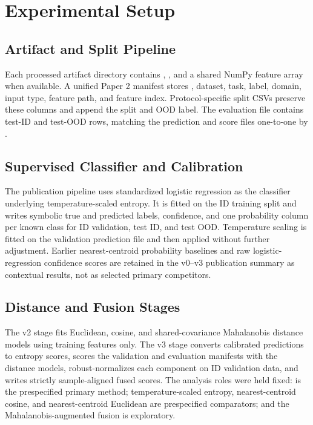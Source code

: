 \section{Experimental Setup}
\label{sec:experimental-setup}

\subsection{Artifact and Split Pipeline}

Each processed artifact directory contains , , and a shared NumPy feature array when available. A unified Paper 2 manifest stores , dataset, task, label, domain, input type, feature path, and feature index. Protocol-specific split CSVs preserve these columns and append the split and OOD label. The evaluation file contains test-ID and test-OOD rows, matching the prediction and score files one-to-one by .

\subsection{Supervised Classifier and Calibration}

The publication pipeline uses standardized logistic regression as the classifier underlying temperature-scaled entropy. It is fitted on the ID training split and writes symbolic true and predicted labels, confidence, and one probability column per known class for ID validation, test ID, and test OOD. Temperature scaling is fitted on the validation prediction file and then applied without further adjustment. Earlier nearest-centroid probability baselines and raw logistic-regression confidence scores are retained in the v0--v3 publication summary as contextual results, not as selected primary competitors.

\subsection{Distance and Fusion Stages}

The v2 stage fits Euclidean, cosine, and shared-covariance Mahalanobis distance models using training features only. The v3 stage converts calibrated predictions to entropy scores, scores the validation and evaluation manifests with the distance models, robust-normalizes each component on ID validation data, and writes strictly sample-aligned fused scores. The analysis roles were held fixed: \primarymethod{} is the prespecified primary method; temperature-scaled entropy, nearest-centroid cosine, and nearest-centroid Euclidean are prespecified comparators; and the Mahalanobis-augmented fusion is exploratory.

